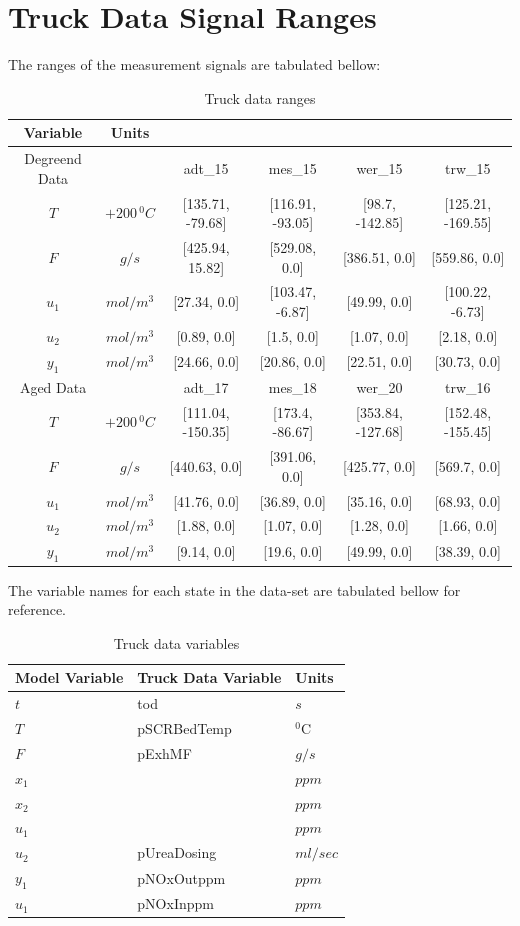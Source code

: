 \section{Truck Data Signal Ranges}
The ranges of the measurement signals are tabulated bellow:
\begin{table}[H]
\centering
\begin{tabular}{c c c c c c}
\hline \hline
Variable & Units & & & & \\
\hline \hline
Degreend Data & & adt\_15 & mes\_15 & wer\_15 & trw\_15 \\ \hline
$T$   & $+200 \, ^0C$ & [135.71, -79.68]& [116.91, -93.05]& [98.7, -142.85]& [125.21, -169.55]
\\
$F$   & $g/s$ & [425.94, 15.82]& [529.08, 0.0]& [386.51, 0.0]& [559.86, 0.0]
\\
$u_1$ & $mol/m^3$ & [27.34, 0.0]& [103.47, -6.87]& [49.99, 0.0]& [100.22, -6.73]
\\
$u_2$ & $mol/m^3$ & [0.89, 0.0]& [1.5, 0.0]& [1.07, 0.0]& [2.18, 0.0]
\\
$y_1$ & $mol/m^3$ & [24.66, 0.0] & [20.86, 0.0] & [22.51, 0.0]& [30.73, 0.0]
\\
\hline
Aged Data & & adt\_17 & mes\_18 & wer\_20 & trw\_16 \\ \hline
$T$   & $+200 \, ^0C$ & [111.04, -150.35]& [173.4, -86.67]& [353.84, -127.68]& [152.48, -155.45]
\\
$F$   & $g/s$ & [440.63, 0.0]& [391.06, 0.0]& [425.77, 0.0]& [569.7, 0.0]
\\
$u_1$ & $mol/m^3$ & [41.76, 0.0]& [36.89, 0.0]& [35.16, 0.0]& [68.93, 0.0]
\\
$u_2$ & $mol/m^3$ & [1.88, 0.0]& [1.07, 0.0]& [1.28, 0.0]& [1.66, 0.0]
\\
$y_1$ & $mol/m^3$ & [9.14, 0.0]& [19.6, 0.0]& [49.99, 0.0]& [38.39, 0.0]
\\
\hline \hline
\end{tabular}
\caption{Truck data ranges}
\end{table}


The variable names for each state in the data-set are tabulated bellow for reference.
\begin{table}[H]
\centering
\begin{tabular}{l l l }
\hline \hline
Model Variable & Truck Data Variable &Units\\
\hline \hline
$t$   & tod & $s$
\\
$T$   & pSCRBedTemp & $^0$C
\\
$F$   & pExhMF & $g/s$
\\
$x_1$ & & $ppm$
\\
$x_2$ & & $ppm$
\\
$u_1$ & & $ppm$
\\
$u_2$ & pUreaDosing & $ml/sec$
\\
$y_1 $ & pNOxOutppm & $ppm$
\\
$u_1$ & pNOxInppm & $ppm$
\\
\hline
\end{tabular}
\caption{Truck data variables}
\end{table}

